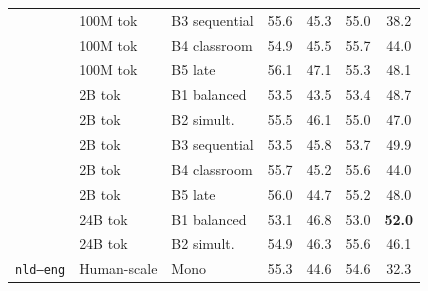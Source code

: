 \begin{table}[t]
\begin{minipage}[t]{0.49\linewidth}
\begin{tabular}{ll l cccc}
 & 100M tok & B3 sequential & \cellcolor[rgb]{0.942,1.000,0.942} 55.6 & \cellcolor[rgb]{1.000,0.955,0.955} 45.3 & \cellcolor[rgb]{0.934,1.000,0.934} 55.0 & \cellcolor[rgb]{1.000,0.870,0.870} 38.2 \\
 & 100M tok & B4 classroom & \cellcolor[rgb]{0.949,1.000,0.949} 54.9 & \cellcolor[rgb]{1.000,0.957,0.957} 45.5 & \cellcolor[rgb]{0.925,1.000,0.925} 55.7 & \cellcolor[rgb]{1.000,0.934,0.934} 44.0 \\
 & 100M tok & B5 late & \cellcolor[rgb]{0.936,1.000,0.936} 56.1 & \cellcolor[rgb]{1.000,0.972,0.972} 47.1 & \cellcolor[rgb]{0.930,1.000,0.930} 55.3 & \cellcolor[rgb]{1.000,0.979,0.979} 48.1 \\
\addlinespace[1.5pt]
 & 2B tok & B1 balanced & \cellcolor[rgb]{0.964,1.000,0.964} 53.5 & \cellcolor[rgb]{1.000,0.937,0.937} 43.5 & \cellcolor[rgb]{0.955,1.000,0.955} 53.4 & \cellcolor[rgb]{1.000,0.986,0.986} 48.7 \\
 & 2B tok & B2 simult. & \cellcolor[rgb]{0.943,1.000,0.943} 55.5 & \cellcolor[rgb]{1.000,0.962,0.962} 46.1 & \cellcolor[rgb]{0.934,1.000,0.934} 55.0 & \cellcolor[rgb]{1.000,0.967,0.967} 47.0 \\
 & 2B tok & B3 sequential & \cellcolor[rgb]{0.964,1.000,0.964} 53.5 & \cellcolor[rgb]{1.000,0.960,0.960} 45.8 & \cellcolor[rgb]{0.951,1.000,0.951} 53.7 & \cellcolor[rgb]{1.000,0.999,0.999} 49.9 \\
 & 2B tok & B4 classroom & \cellcolor[rgb]{0.941,1.000,0.941} 55.7 & \cellcolor[rgb]{1.000,0.954,0.954} 45.2 & \cellcolor[rgb]{0.926,1.000,0.926} 55.6 & \cellcolor[rgb]{1.000,0.934,0.934} 44.0 \\
 & 2B tok & B5 late & \cellcolor[rgb]{0.937,1.000,0.937} 56.0 & \cellcolor[rgb]{1.000,0.949,0.949} 44.7 & \cellcolor[rgb]{0.931,1.000,0.931} 55.2 & \cellcolor[rgb]{1.000,0.978,0.978} 48.0 \\
\addlinespace[1.5pt]
 & 24B tok & B1 balanced & \cellcolor[rgb]{0.968,1.000,0.968} 53.1 & \cellcolor[rgb]{1.000,0.969,0.969} 46.8 & \cellcolor[rgb]{0.960,1.000,0.960} 53.0 & \cellcolor[rgb]{0.959,1.000,0.959} \textbf{52.0} \\
 & 24B tok & B2 simult. & \cellcolor[rgb]{0.949,1.000,0.949} 54.9 & \cellcolor[rgb]{1.000,0.964,0.964} 46.3 & \cellcolor[rgb]{0.926,1.000,0.926} 55.6 & \cellcolor[rgb]{1.000,0.957,0.957} 46.1 \\
\midrule
\texttt{nld--eng} & Human-scale & Mono & \cellcolor[rgb]{0.945,1.000,0.945} 55.3 & \cellcolor[rgb]{1.000,0.948,0.948} 44.6 & \cellcolor[rgb]{0.939,1.000,0.939} 54.6 & \cellcolor[rgb]{1.000,0.805,0.805} 32.3 \\

\end{tabular}
\end{minipage}
\end{table}
